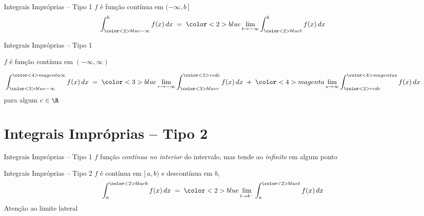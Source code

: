 \documentclass[fleqn,utf8,aspectratio=169,12pt]{beamer}
\begin{document}
\begin{frame}{Integrais Impróprias -- Tipo 1}
  $f$ é função contínua em \((-\infty, b\,]\)
  \large
  \[
    \int_{{\color<2>{blue} -\infty}}^b f(x) \, dx
    \;=\; {\color<2>{blue} \lim_{t\to-\infty}}
    \int_{{\color<2>{blue} t}}^{b} f(x) \,dx
  \]
\end{frame}

\begin{frame}{Integrais Impróprias -- Tipo 1}

  $f$ é função contínua em \((-\infty, \infty)\)

  {\large
  \[
    \int_{{\color<3>{blue}  -\infty}}
        ^{{\color<4>{magenta}\infty}} f(x) \, dx
    \;=\; {\color<3>{blue}   \lim_{r\to-\infty}}
    \int_{{\color<3>{blue}{r}}}
        ^{{\color<2>{red} c}} f(x) \, dx
    \;+\; {\color<4>{magenta}\lim_{s \to \infty}}
    \int_{{\color<2>{red} c}}
        ^{{\color<4>{magenta}s}} f(x) \, dx
  \]}
  para algum { $c$} $\in\R$
\end{frame}



\section{Integrais Impróprias -- Tipo 2}

\begin{frame}{Integrais Impróprias -- Tipo 1}
  $f$ função \emph{contínua no interior} do intervalo,
  mas tende ao \emph{infinito} em algum ponto
\end{frame}

\begin{frame}{Integrais Impróprias -- Tipo 2}
  $f$ é contínua em {\color{blue} $[\,a, b)$} e descontínua em $b$,
  {
  \large
  \[
    \int_{a}^{{\color<2>{blue} b}} f(x)\,dx
    \;=\;     {\color<2>{blue} \lim_{t\to b^{-}}}
    \int_{a}^{{\color<2>{blue} t}} f(x)\,dx
  \]}
  Atenção ao limite lateral
\end{frame}
\end{document}
